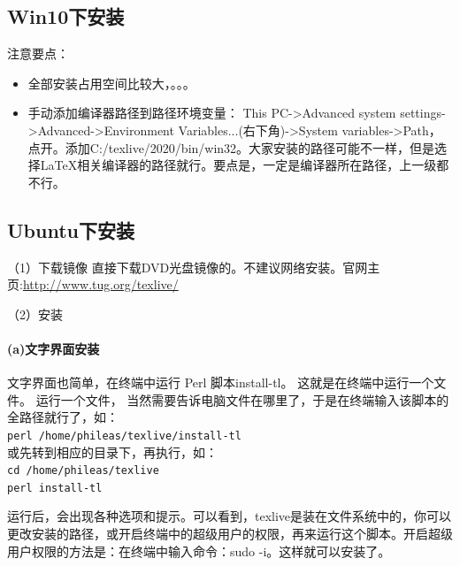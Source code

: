 \subsection{Win10下安装}
注意要点：
\begin{itemize}
\item 全部安装占用空间比较大，。。。
\item 手动添加编译器路径到路径环境变量：
This PC->Advanced system settings->Advanced->Environment Variables...(右下角)->System variables->Path，点开。添加C:/texlive/2020/bin/win32。大家安装的路径可能不一样，但是选择\LaTeX{}相关编译器的路径就行。要点是，一定是编译器所在路径，上一级都不行。
\end{itemize}



\subsection{Ubuntu下安装}
（1）下载镜像
直接下载DVD光盘镜像的。不建议网络安装。官网主页:\url{http://www.tug.org/texlive/}


（2）安装
\paragraph{(a)文字界面安装}
文字界面也简单，在终端中运行 Perl 脚本install-tl。 这就是在终端中运行一个文件。 运行一个文件， 当然需要告诉电脑文件在哪里了，于是在终端输入该脚本的全路径就行了，如：\\
\verb*|perl /home/phileas/texlive/install-tl|\\
或先转到相应的目录下，再执行，如：\\
\verb*|cd /home/phileas/texlive|\\
\verb*|perl install-tl|

运行后，会出现各种选项和提示。可以看到，texlive是装在文件系统中的，你可以更改安装的路径，或开启终端中的超级用户的权限，再来运行这个脚本。开启超级用户权限的方法是：在终端中输入命令：sudo -i。这样就可以安装了。

